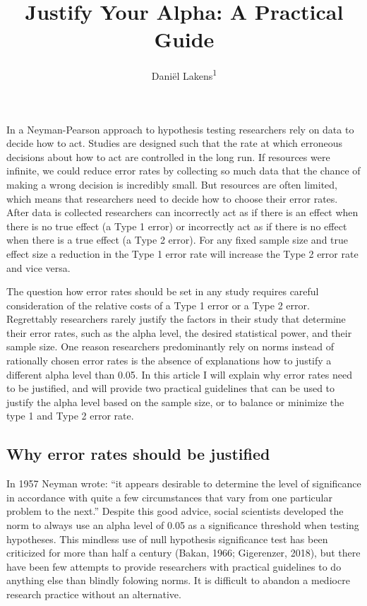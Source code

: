 \documentclass[,jou,floatsintext]{apa6}
\title{Justify Your Alpha: A Practical Guide}
\author{Daniël Lakens\textsuperscript{1}}
\date{}
\affiliation{
\vspace{0.5cm}
\textsuperscript{1} Eindhoven University of Technology, The Netherlands}
\begin{document}
\maketitle

In a Neyman-Pearson approach to hypothesis testing researchers rely on data to decide how to act. Studies are designed such that the rate at which erroneous decisions about how to act are controlled in the long run. If resources were infinite, we could reduce error rates by collecting so much data that the chance of making a wrong decision is incredibly small. But resources are often limited, which means that researchers need to decide how to choose their error rates. After data is collected researchers can incorrectly act as if there is an effect when there is no true effect (a Type 1 error) or incorrectly act as if there is no effect when there is a true effect (a Type 2 error). For any fixed sample size and true effect size a reduction in the Type 1 error rate will increase the Type 2 error rate and vice versa.

The question how error rates should be set in any study requires careful consideration of the relative costs of a Type 1 error or a Type 2 error. Regrettably researchers rarely justify the factors in their study that determine their error rates, such as the alpha level, the desired statistical power, and their sample size. One reason researchers predominantly rely on norms instead of rationally chosen error rates is the absence of explanations how to justify a different alpha level than 0.05. In this article I will explain why error rates need to be justified, and will provide two practical guidelines that can be used to justify the alpha level based on the sample size, or to balance or minimize the type 1 and Type 2 error rate.

\hypertarget{why-error-rates-should-be-justified}{%
\subsection{Why error rates should be justified}\label{why-error-rates-should-be-justified}}

In 1957 Neyman wrote: \enquote{it appears desirable to determine the level of significance in accordance with quite a few circumstances that vary from one particular problem to the next.} Despite this good advice, social scientists developed the norm to always use an alpha level of 0.05 as a significance threshold when testing hypotheses. This mindless use of null hypothesis significance test has been criticized for more than half a century (Bakan, 1966; Gigerenzer, 2018), but there have been few attempts to provide researchers with practical guidelines to do anything else than blindly folowing norms. It is difficult to abandon a mediocre research practice without an alternative.
\end{document}
